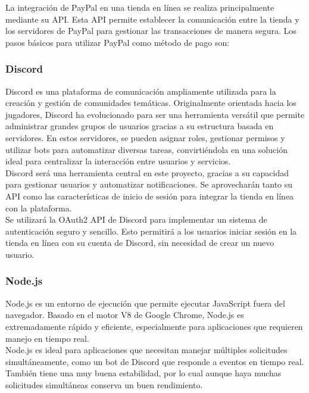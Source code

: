 \documentclass[a4paper,12pt]{article}
\begin{document}
La integración de PayPal en una tienda en línea se realiza principalmente mediante su API. Esta API permite establecer la comunicación entre la tienda y los servidores de PayPal para gestionar las transacciones de manera segura. Los pasos básicos para utilizar PayPal como método de pago son:\\


\subsubsection{Discord}

Discord es una plataforma de comunicación ampliamente utilizada para la creación y gestión de comunidades temáticas. Originalmente orientada hacia los jugadores, Discord ha evolucionado para ser una herramienta versátil que permite administrar grandes grupos de usuarios gracias a su estructura basada en servidores. En estos servidores, se pueden asignar roles, gestionar permisos y utilizar bots para automatizar diversas tareas, convirtiéndola en una solución ideal para centralizar la interacción entre usuarios y servicios.\\

Discord será una herramienta central en este proyecto, gracias a su capacidad para gestionar usuarios y automatizar notificaciones. Se aprovecharán tanto su API como las características de inicio de sesión para integrar la tienda en línea con la plataforma.\\

Se utilizará la OAuth2 API de Discord para implementar un sistema de autenticación seguro y sencillo. Esto permitirá a los usuarios iniciar sesión en la tienda en línea con su cuenta de Discord, sin necesidad de crear un nuevo usuario.
\newpage

\subsubsection{Node.js}


Node.js es un entorno de ejecución que permite ejecutar JavaScript fuera del navegador. Basado en el motor V8 de Google Chrome, Node.js es extremadamente rápido y eficiente, especialmente para aplicaciones que requieren manejo en tiempo real.\\

Node.js es ideal para aplicaciones que necesitan manejar múltiples solicitudes simultáneamente, como un bot de Discord que responde a eventos en tiempo real. También tiene una muy buena estabilidad, por lo cual aunque haya muchas solicitudes simultáneas conserva un buen rendimiento.\\
\end{document}
